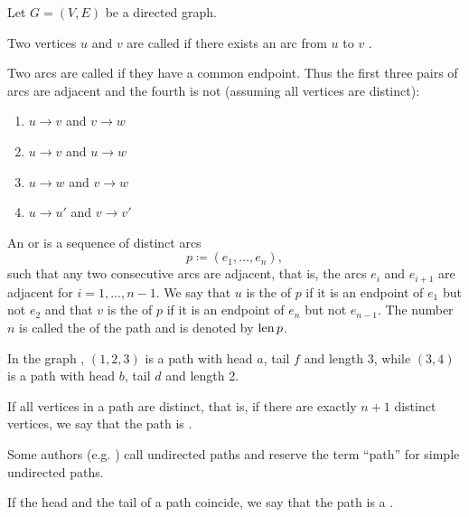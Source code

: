 \begin{definition}\label{def:graph_paths}
  Let \( G = (V, E) \) be a directed graph.

  \begin{DefEnum}
     Two vertices \( u \)  and \( v \)  are called  if there exists an arc from \( u \)  to \( v \) .

     Two arcs are called  if they have a common endpoint. Thus the first three pairs of arcs are adjacent and the fourth is not (assuming all vertices are distinct):
    \begin{enumerate}
      \item \( u \to v \) and \( v \to w \)
      \item \( u \to v \) and \( u \to w \)
      \item \( u \to w \) and \( v \to w \)
      \item \( u \to u' \) and \( v \to v' \)
    \end{enumerate}

     An  or  is a sequence of distinct arcs
    \begin{equation*}
      p \coloneqq ( e_1, \ldots, e_n ),
    \end{equation*}
    such that any two consecutive arcs are adjacent, that is, the arcs \( e_i \) and \( e_{i+1} \) are adjacent for \( i = 1, \ldots, n - 1 \). We say that \( u \) is the  of \( p \) if it is an endpoint of \( e_1 \) but not \( e_2 \) and that \( v \) is the  of \( p \) if it is an endpoint of \( e_n \) but not \( e_{n-1} \). The number $n$ is called the  of the path and is denoted by \( \operatorname{len} p \).

    In the graph , \( (1, 2, 3) \) is a path with head \( a \), tail \( f \) and length 3, while \( (3, 4) \) is a path with head \( b \), tail \( d \) and length 2.

    If all vertices in a path are distinct, that is, if there are exactly $n + 1$ distinct vertices, we say that the path is .

    Some authors (e.g. \cite[sec. 5.2]{Erickson2019}) call undirected paths  and reserve the term \enquote{path} for simple undirected paths.

    If the head and the tail of a path coincide, we say that the path is a .


\end{DefEnum}
\end{definition}

